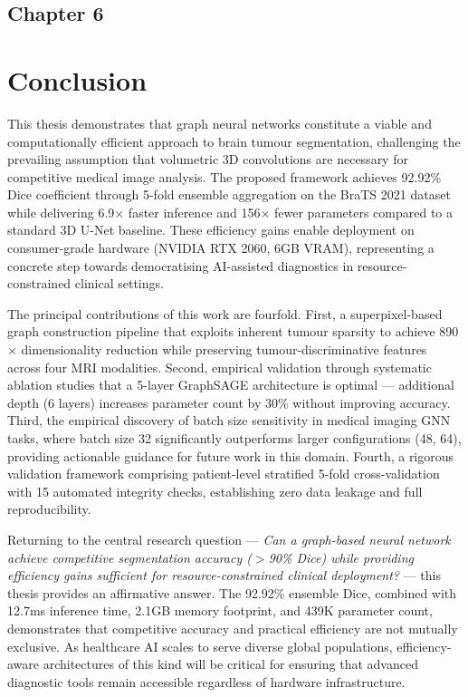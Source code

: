 \begin{center}
    \section*{\fontsize{20}{20}\selectfont Chapter 6}
\end{center}
\vspace{10mm}

\section{Conclusion}

This thesis demonstrates that graph neural networks constitute a viable and computationally efficient approach to brain tumour segmentation, challenging the prevailing assumption that volumetric 3D convolutions are necessary for competitive medical image analysis. The proposed framework achieves 92.92\% Dice coefficient through 5-fold ensemble aggregation on the BraTS 2021 dataset while delivering 6.9$\times$ faster inference and 156$\times$ fewer parameters compared to a standard 3D U-Net baseline. These efficiency gains enable deployment on consumer-grade hardware (NVIDIA RTX 2060, 6GB VRAM), representing a concrete step towards democratising AI-assisted diagnostics in resource-constrained clinical settings.

The principal contributions of this work are fourfold. First, a superpixel-based graph construction pipeline that exploits inherent tumour sparsity to achieve 890$\times$ dimensionality reduction while preserving tumour-discriminative features across four MRI modalities. Second, empirical validation through systematic ablation studies that a 5-layer GraphSAGE architecture is optimal — additional depth (6 layers) increases parameter count by 30\% without improving accuracy. Third, the empirical discovery of batch size sensitivity in medical imaging GNN tasks, where batch size 32 significantly outperforms larger configurations (48, 64), providing actionable guidance for future work in this domain. Fourth, a rigorous validation framework comprising patient-level stratified 5-fold cross-validation with 15 automated integrity checks, establishing zero data leakage and full reproducibility.

Returning to the central research question — \textit{Can a graph-based neural network achieve competitive segmentation accuracy ($>$90\% Dice) while providing efficiency gains sufficient for resource-constrained clinical deployment?} — this thesis provides an affirmative answer. The 92.92\% ensemble Dice, combined with 12.7ms inference time, 2.1GB memory footprint, and 439K parameter count, demonstrates that competitive accuracy and practical efficiency are not mutually exclusive. As healthcare AI scales to serve diverse global populations, efficiency-aware architectures of this kind will be critical for ensuring that advanced diagnostic tools remain accessible regardless of hardware infrastructure.


